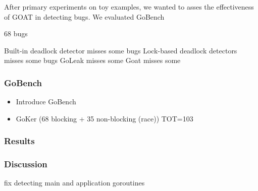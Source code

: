 After primary experiments on toy examples, we wanted to asses the effectiveness of GOAT in detecting bugs.
%
We evaluated GoBench

68 bugs

Built-in deadlock detector misses some bugs
Lock-based deadlock detectors misses some bugs
GoLeak misses some
Goat misses some

\subsubsection{GoBench}
\label{sec:gobench}
\begin{itemize}
  \item Introduce GoBench
  \item GoKer (68 blocking + 35 non-blocking (race)) TOT=103
\end{itemize}
\subsubsection{Results}
\label{sec:results}

\subsubsection{Discussion}
\label{discussion}



fix detecting main and application goroutines 
